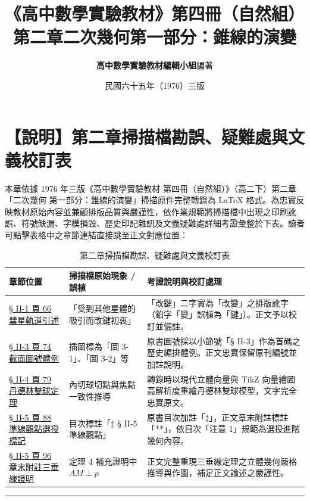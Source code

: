 \documentclass[a4paper,12pt,twoside]{article}
\title{\LARGE\textbf{《高中數學實驗教材》第四冊（自然組）}\\[0.5em] \Large\textbf{第二章\quad 二次幾何\quad 第一部分：錐線的演變}}
\author{\textbf{高中數學實驗教材編輯小組}\quad 編著}
\date{民國六十五年（1976）三版}
\begin{document}
\maketitle
\thispagestyle{firstpage}

\section*{【說明】第二章掃描檔勘誤、疑難處與文義校訂表}
\label{sec:errata_notes_b4_ch2}

本章依據 1976 年三版《高中數學實驗教材 第四冊（自然組）》（高二下）第二章「二次幾何 第一部分：錐線的演變」掃描原件完整轉錄為 \LaTeX{} 格式。為忠實反映教材原始內容並兼顧排版品質與嚴謹性，依作業規範將掃描檔中出現之印刷訛誤、符號缺漏、字模損毀、歷史印記雜訊及文義疑難處詳細考證彙整於下表。讀者可點擊表格中之章節連結直接跳至正文對應位置：

\begin{table}[H]
\centering
\small
\renewcommand{\arraystretch}{1.35}
\begin{tabularx}{\textwidth}{|p{3.2cm}|p{3.8cm}|X|}
\hline
\textbf{章節位置} & \textbf{掃描檔原始現象 / 誤植} & \textbf{考證說明與校訂處理} \\ \hline

\hyperref[sec:b4-2-1]{§ II-1 頁 66 彗星軌道引述} & 
「受到其他星體的吸引而改鍵初衷」 & 
「改鍵」二字實為「改變」之排版訛字（鉛字「變」誤植為「鍵」）。正文予以校訂並備註。 \\ \hline

\hyperref[sec:b4-2-3]{§ II-3 頁 74 截面圖號體例} & 
插圖標為「圖 3-1」、「圖 3-2」等 & 
原書圖號採以小節號「§ II-3」作為首碼之歷史編排體例。正文忠實保留原刊編號並加註說明。 \\ \hline

\hyperref[sec:b4-2-4]{§ II-4 頁 79 丹德林雙球定理} & 
內切球切點與焦點一致性推導 & 
轉錄時以現代立體向量與 TikZ 向量繪圖高解析度重繪丹德林雙球模型，文字完全忠實原文。 \\ \hline

\hyperref[sec:b4-2-5]{§ II-5 頁 88 準線觀點選授標記} & 
目次標註「$\ddagger$ § II-5 準線觀點」 & 
原書目次加註「$\ddagger$」，正文章末附註標註「**」，依目次「注意 1」規範為選授進階幾何內容。 \\ \hline

\hyperref[note:b4-ch2-p96-appendix-note]{§ II-5 頁 96 章末附註三垂線證明} & 
定理 4 補充證明中 $AM \perp p$ & 
正文完整重現三垂線定理之立體幾何嚴格推導與作圖，補足正文論述之嚴謹性。 \\ \hline

\end{tabularx}
\caption{第二章掃描檔勘誤、疑難處與文義校訂表}
\label{tab:errata_b4_ch2}
\end{table}

\vspace{1em}
\hrule
\vspace{1em}

\tableofcontents
\newpage


\end{document}
